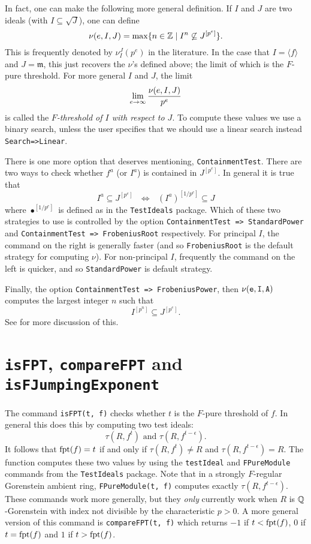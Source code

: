 \documentclass{amsart}
\newcommand{\fram}{\mathfrak{m}}
\begin{document}
In fact, one can make the following more general definition.  If $I$ and $J$ are two ideals (with $I \subseteq \sqrt{J}$), one can define
\[
\nu(e, I, J) = \max \{ n \in \mathbb{Z} \; |\; I^n \not\subseteq J^{[p^e]} \}.
\]
This is frequently denoted by $\nu_I^J(p^e)$ in the literature.  In the case that $I = \langle f \rangle$ and $J = \fram$, this just recovers the $\nu$'s defined above; the limit of which is the $F$-pure threshold.  For more general $I$ and $J$, the limit
\[
\lim_{e \to \infty} {\nu(e, I, J) \over p^e}
\]
is called the \emph{$F$-threshold of $I$ with respect to $J$}.  To compute these values we use a binary search, unless the user specifies that we should use a linear search instead {\tt Search=>Linear}.

There is one more option that deserves mentioning, {\tt ContainmentTest}.  There are two ways to check whether $f^a$ (or $I^a$) is contained in $J^{[p^e]}$.  In general it is true that
\[
I^a \subseteq J^{[p^e]} \text{ $\Leftrightarrow$ } (I^a)^{[1/p^e]} \subseteq J
\]
where $\bullet^{[1/p^e]}$ is defined as in the {\tt TestIdeals} package.  Which of these two strategies to use is controlled by the option {\tt ContainmentTest => StandardPower} and {\tt ContainmentTest => FrobeniusRoot} respectively.
For principal $I$, the command on the right is generally faster (and so {\tt FrobeniusRoot} is the default strategy for computing $\nu$).  For non-principal $I$, frequently the command on the left is quicker, and so {\tt StandardPower} is default strategy.

Finally, the option {\tt ContainmentTest => FrobeniusPower}, then ${\tt \nu(e, I, A)}$ computes the largest integer $n$ such that
\[
I^{[p^n]} \subseteq J^{[p^e]}.
\]
See \cite{HernandezTeixeiraWittFrobeniusPowers} for more discussion of this.

\section{{\tt isFPT}, {\tt compareFPT} and {\tt isFJumpingExponent}}
\label{sec.IsFPT}

The command {\tt isFPT(t, f)} checks whether $t$ is the $F$-pure threshold of $f$.  In general this does this by computing two test ideals:
\[
\tau(R, f^t) \text{ and } \tau(R, f^{t-\epsilon}).
\]
It follows that $\operatorname{{fpt}}(f) = t$ if and only if $\tau(R, f^t) \neq R$ and $\tau(R, f^{t-\epsilon}) = R$.  The function computes these two values by using the {\tt testIdeal} and {\tt FPureModule} commands from the {\tt TestIdeals} package.  Note that in a strongly $F$-regular Gorenstein ambient ring, {\tt FPureModule(t, f)} computes exactly $\tau(R, f^{t-\epsilon})$.  These commands work more generally, but they \emph{only} currently work when $R$ is $\mathbb{Q}$-Gorenstein with index not divisible by the characteristic $p > 0$.  A more general version of this command is {\tt compareFPT(t, f)} which returns $-1$ if $t < \operatorname{{fpt}}(f)$, $0$ if $t = \operatorname{{fpt}}(f)$ and $1$ if $t > \operatorname{{fpt}}(f)$.
\end{document}
